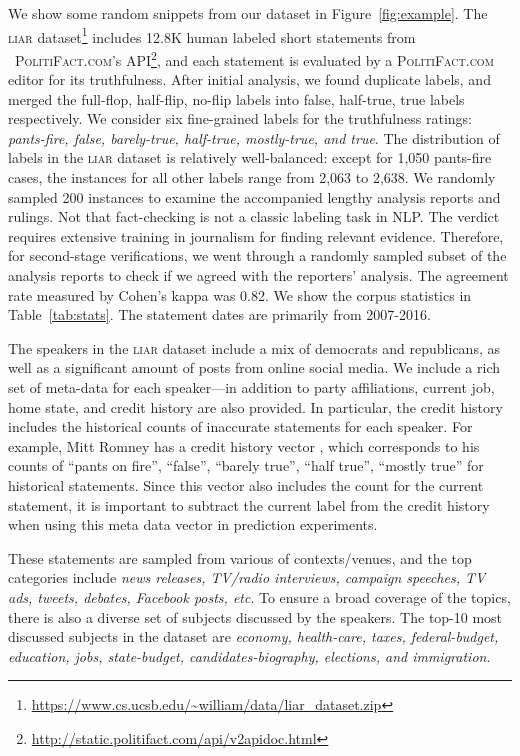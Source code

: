 \documentclass[11pt,a4paper]{article}
\begin{document}
{\sloppypar
We show some random snippets from our dataset in Figure~\ref{fig:example}. The \textsc{liar} dataset\footnote{\url{https://www.cs.ucsb.edu/~william/data/liar\_dataset.zip}} includes 12.8K human labeled short statements from
~\textsc{PolitiFact.com}'s API\footnote{\url{http://static.politifact.com/api/v2apidoc.html}}, and each statement is evaluated by a \textsc{PolitiFact.com} editor for its truthfulness. After initial analysis, we found duplicate labels, and merged the full-flop, half-flip, no-flip labels into false, half-true, true labels respectively. We consider six fine-grained labels for the truthfulness ratings: \emph{pants-fire, false, barely-true, half-true, mostly-true, and true}. 
The distribution of labels in the \textsc{liar} dataset is relatively well-balanced: except for 1,050 pants-fire cases, the instances for all other labels range from 2,063 to 2,638. We randomly sampled 200 instances to examine the accompanied lengthy analysis reports and rulings. 
Not that fact-checking is not a classic labeling task in NLP. The verdict requires extensive training in journalism for finding relevant evidence. Therefore, for second-stage verifications, we went through a randomly sampled subset of the analysis reports to check if we agreed with the reporters' analysis. The agreement rate measured by Cohen’s kappa was 0.82. We show the corpus statistics in Table~\ref{tab:stats}. The statement dates are primarily from 2007-2016.} 

The speakers in the \textsc{liar} dataset include a mix of democrats and republicans,
as well as a significant amount of posts from online social media. We include a rich set of meta-data for each speaker---in addition to party affiliations, current job, home state, and credit history are also provided. In particular, the credit history includes the historical counts of inaccurate statements for each speaker. For example, Mitt Romney has a credit history vector ,
which corresponds to his counts of ``pants on fire'', ``false'', ``barely true'',  ``half true'', ``mostly true'' for historical statements. Since this vector also includes the count for the current statement, it is important to subtract the current label from the credit history when using this meta data vector in prediction experiments. 

These statements are sampled from various of contexts/venues, and the top categories include \emph{news releases, TV/radio interviews, campaign speeches, TV ads, tweets, debates, Facebook posts, etc}. To ensure a broad coverage of the topics, there is also a diverse set of subjects discussed by the speakers. The top-10 most discussed subjects in the dataset are \emph{economy, health-care, taxes, federal-budget, education, jobs, state-budget, candidates-biography, elections, and immigration}.
\end{document}
